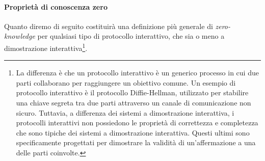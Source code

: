 \documentclass{article}
\theoremstyle{definition}
\begin{document}
\paragraph{Proprietà di conoscenza zero}
Quanto diremo di seguito costituirà una definizione più generale di \emph{zero-knowledge} per qualsiasi tipo di protocollo interattivo, che sia o meno a dimostrazione interattiva\footnote{La differenza è che un protocollo interattivo è un generico processo in cui due parti collaborano per raggiungere un obiettivo comune. Un esempio di protocollo interattivo è il protocollo Diffie-Hellman, utilizzato per stabilire una chiave segreta tra due parti attraverso un canale di comunicazione non sicuro. Tuttavia, a differenza dei sistemi a dimostrazione interattiva, i protocolli interattivi non possiedono le proprietà di correttezza e completezza che sono tipiche dei sistemi a dimostrazione interattiva. Questi ultimi sono specificamente progettati per dimostrare la validità di un'affermazione a una delle parti coinvolte.}. 
\end{document}
